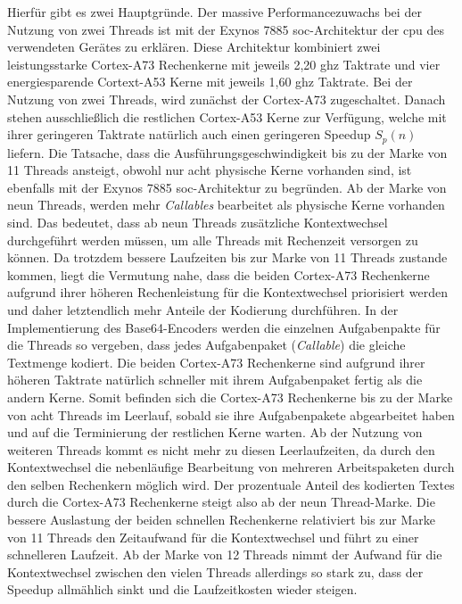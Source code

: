 Hierfür gibt es zwei Hauptgründe. Der massive Performancezuwachs bei der Nutzung von zwei Threads ist mit der Exynos 7885 \ac{soc}-Architektur der \ac{cpu} des verwendeten Gerätes zu erklären. Diese Architektur kombiniert zwei leistungsstarke Cortex-A73 Rechenkerne mit jeweils 2,20 \ac{ghz} Taktrate und vier energiesparende Cortext-A53 Kerne mit jeweils 1,60 \ac{ghz} Taktrate. Bei der Nutzung von zwei Threads, wird zunächst der Cortex-A73 zugeschaltet. Danach stehen ausschließlich die restlichen Cortex-A53 Kerne zur Verfügung, welche mit ihrer geringeren Taktrate natürlich auch einen geringeren Speedup $S_{p}(n)$ liefern. Die Tatsache, dass die Ausführungsgeschwindigkeit bis zu der Marke von 11 Threads ansteigt, obwohl nur acht physische Kerne vorhanden sind, ist ebenfalls mit der Exynos 7885 \ac{soc}-Architektur zu begründen. Ab der Marke von neun Threads, werden mehr \emph{Callables} bearbeitet als physische Kerne vorhanden sind. Das bedeutet, dass ab neun Threads zusätzliche Kontextwechsel durchgeführt werden müssen, um alle Threads mit Rechenzeit versorgen zu können. Da trotzdem bessere Laufzeiten bis zur Marke von 11 Threads zustande kommen, liegt die Vermutung nahe, dass die beiden Cortex-A73 Rechenkerne aufgrund ihrer höheren Rechenleistung für die Kontextwechsel priorisiert werden und daher letztendlich mehr Anteile der Kodierung durchführen. In der Implementierung des Base64-Encoders werden die einzelnen Aufgabenpakte für die Threads so vergeben, dass jedes Aufgabenpaket (\emph{Callable}) die gleiche Textmenge kodiert. Die beiden Cortex-A73 Rechenkerne sind aufgrund ihrer höheren Taktrate natürlich schneller mit ihrem Aufgabenpaket fertig als die andern Kerne. Somit befinden sich die Cortex-A73 Rechenkerne bis zu der Marke von acht Threads im Leerlauf, sobald sie ihre Aufgabenpakete abgearbeitet haben und auf die Terminierung der restlichen Kerne warten. Ab der Nutzung von weiteren Threads kommt es nicht mehr zu diesen Leerlaufzeiten, da durch den Kontextwechsel die nebenläufige Bearbeitung von mehreren Arbeitspaketen durch den selben Rechenkern möglich wird. Der prozentuale Anteil des kodierten Textes durch die Cortex-A73 Rechenkerne steigt also ab der neun Thread-Marke. Die bessere Auslastung der beiden schnellen Rechenkerne relativiert bis zur Marke von 11 Threads den Zeitaufwand für die Kontextwechsel und führt zu einer schnelleren Laufzeit. Ab der Marke von 12 Threads nimmt der Aufwand für die Kontextwechsel zwischen den vielen Threads allerdings so stark zu, dass der Speedup allmählich sinkt und die Laufzeitkosten wieder steigen. 

